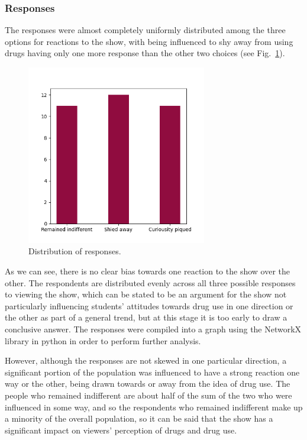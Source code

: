 \documentclass[runningheads]{llncs}
\begin{document}
\subsubsection{Responses}
The responses were almost completely uniformly distributed among the three options for reactions to the show, with being influenced to shy away from using drugs having only one more response than the other two choices (see Fig.~\ref{fig2}).
\begin{figure}
\begin{center}
\includegraphics[width=0.7\textwidth]{Project/fig2.png}
\caption{Distribution of responses.} \label{fig2}
\end{center}
\end{figure}
\FloatBarrier
As we can see, there is no clear bias towards one reaction to the show over the other. The respondents are distributed evenly across all three possible responses to viewing the show, which can be stated to be an argument for the show not particularly influencing students' attitudes towards drug use in one direction or the other as part of a general trend, but at this stage it is too early to draw a conclusive answer. The responses were compiled into a graph using the NetworkX library in python in order to perform further analysis. 

However, although the responses are not skewed in one particular direction, a significant portion of the population was influenced to have a strong reaction one way or the other, being drawn towards or away from the idea of drug use. The people who remained indifferent are about half of the sum of the two who were influenced in some way, and so the respondents who remained indifferent make up a minority of the overall population, so it can be said that the show has a significant impact on viewers' perception of drugs and drug use.
\end{document}
